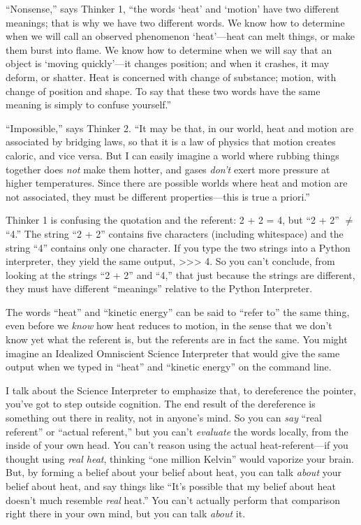 {
 ``Nonsense,'' says Thinker 1,
``the words `heat' and
`motion' have two different meanings;
that is why we have two different words. We know how to determine when
we will call an observed phenomenon
`heat'---heat can melt things, or make
them burst into flame. We know how to determine when we will say that
an object is `moving quickly'---it
changes position; and when it crashes, it may deform, or shatter. Heat
is concerned with change of substance; motion, with change of position
and shape. To say that these two words have the same meaning is simply
to confuse yourself.''}

{
 ``Impossible,'' says Thinker 2.
``It may be that, in our world, heat and motion are
associated by bridging laws, so that it is a law of physics that motion
creates caloric, and vice versa. But I can easily imagine a world where
rubbing things together does \textit{not} make them hotter, and gases
\textit{don't} exert more pressure at higher
temperatures. Since there are possible worlds where heat and motion are
not associated, they must be different properties---this is true a
priori.''}

{
 Thinker 1 is confusing the quotation and the referent: 2 + 2 = 4,
but ``2 + 2'' ${\neq}$
``4.'' The string
``2 + 2'' contains five characters
(including whitespace) and the string
``4'' contains only one character.
If you type the two strings into a Python interpreter, they yield the
same output, {\textgreater}{\textgreater}{\textgreater} 4. So you
can't conclude, from looking at the strings
``2 + 2'' and
``4,'' that just because the strings
are different, they must have different
``meanings'' relative to the Python
Interpreter.}

{
 The words ``heat'' and
``kinetic energy'' can be said to
``refer to'' the same thing, even
before we \textit{know} how heat reduces to motion, in the sense that
we don't know yet what the referent is, but the
referents are in fact the same. You might imagine an Idealized
Omniscient Science Interpreter that would give the same output when we
typed in ``heat'' and
``kinetic energy'' on the command
line.}

{
 I talk about the Science Interpreter to emphasize that, to
dereference the pointer, you've got to step outside
cognition. The end result of the dereference is something out there in
reality, not in anyone's mind. So you can \textit{say}
``real referent'' or
``actual referent,'' but you
can't \textit{evaluate} the words locally, from the
inside of your own head. You can't reason using the
actual heat-referent---if you thought using \textit{real heat},
thinking ``one million Kelvin''
would vaporize your brain. But, by forming a belief about your belief
about heat, you can talk \textit{about} your belief about heat, and say
things like ``It's possible that my
belief about heat doesn't much resemble \textit{real}
heat.'' You can't actually perform
that comparison right there in your own mind, but you can talk
\textit{about} it.}

